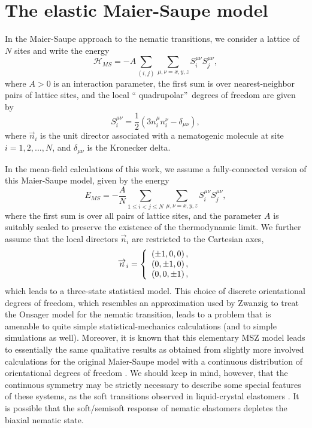 \documentclass[aps,pre,reprint,amsmath,amssymbols,superscriptaddress,
nofootinbib]{revtex4-1}
\begin{document}
\section{The elastic Maier-Saupe model}

In the Maier-Saupe approach to the nematic transitions, we consider a lattice
of $N$ sites and write the energy%
\begin{equation}
\mathcal{H}_{MS}=-A\sum_{\left(  i,j\right)  }\sum_{\mu,\nu=x,y,z}S_{i}%
^{\mu\nu}S_{j}^{\mu\nu},
\end{equation}
where $A>0$ is an interaction parameter, the first sum is over
nearest-neighbor pairs of lattice sites, and the local \textquotedblleft
quadrupolar\textquotedblright\ degrees of freedom are given by
\begin{equation}
S_{i}^{\mu\nu}=\frac{1}{2}\left(  3n_{i}^{\mu}n_{i}^{\nu}-\delta_{\mu\nu
}\right)  ,
\end{equation}
where $\overrightarrow{n}_{i}$ is the unit director associated with a
nematogenic molecule at site $i=1,2,...,N$, and $\delta_{\mu\nu}$ is the
Kronecker delta.

In the mean-field calculations of this work, we assume a fully-connected
version of this Maier-Saupe model, given by the energy%
\begin{equation}
E_{MS}=-\frac{A}{N}\sum_{1\leq i<j\leq N}\sum_{\mu,\nu=x,y,z}S_{i}^{\mu\nu
}S_{j}^{\mu\nu},\label{ems}%
\end{equation}
where the first sum is over all pairs of lattice sites, and the parameter $A$
is suitably scaled to preserve the existence of the thermodynamic limit.
We further assume that the local directors $\overrightarrow{n}_{i}$ are
restricted to the Cartesian axes,%
\begin{equation}
\overrightarrow{n}_{i}=\left\{
\begin{array}
[c]{c}%
\left(  \pm1,0,0\right)  ,\\
\left(  0,\pm1,0\right)  ,\\
\left(  0,0,\pm1\right)  ,
\end{array}
\right. \label{directors}%
\end{equation}
which leads to a three-state statistical model. This choice of discrete
orientational degrees of freedom, which resembles an approximation used by
Zwanzig to treat the Onsager model for the nematic transition, leads to a
problem that is amenable to quite simple statistical-mechanics calculations
(and to simple simulations as well). Moreover, it is known that this
elementary MSZ model leads to essentially the same qualitative results as
obtained from slightly more involved calculations for the original Maier-Saupe
model with a continuous distribution of orientational degrees of freedom
\cite{Liarte2014,Nascimento2016}. We should keep in mind, however, that
the continuous symmetry may be strictly necessary to describe some special
features of these systems, as the soft transitions observed in liquid-crystal
elastomers \cite{Liarte2013}. It is possible that the soft/semisoft response
of nematic elastomers depletes the biaxial nematic state.
\end{document}
